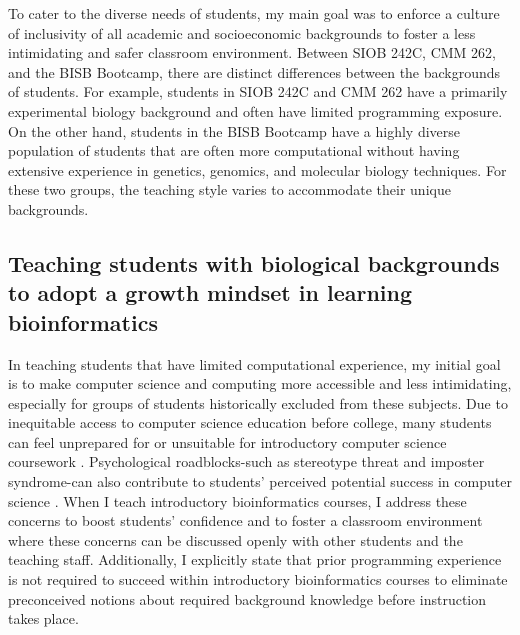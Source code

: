 To cater to the diverse needs of students, my main goal was to enforce a culture of inclusivity of all academic and socioeconomic backgrounds to foster a less intimidating and safer classroom environment. Between SIOB 242C, CMM 262, and the BISB Bootcamp, there are distinct differences between the backgrounds of students. For example, students in SIOB 242C and CMM 262 have a primarily experimental biology background and often have limited programming exposure. On the other hand, students in the BISB Bootcamp have a highly diverse population of students that are often more computational without having extensive experience in genetics, genomics, and molecular biology techniques. For these two groups, the teaching style varies to accommodate their unique backgrounds. 

\subsection{Teaching students with biological backgrounds to adopt a growth mindset in learning bioinformatics}

In teaching students that have limited computational experience, my initial goal is to make computer science and computing more accessible and less intimidating, especially for groups of students historically excluded from these subjects. Due to inequitable access to computer science education before college, many students can feel unprepared for or unsuitable for introductory computer science coursework \cite{wang2016,stout2017,brown2010,kirby1990,hubbardcheuoua2021,lewis2015,rogers2016,shah2014,shinohara2020}. Psychological roadblocks-such as stereotype threat and imposter syndrome-can also contribute to students' perceived potential success in computer science \cite{steele2002,thoman2013,stout2017,smith2008,eschenbach2014,bell2003,kumar2012,halljr.2018,falkner2015,rosenstein2020}. When I teach introductory bioinformatics courses, I address these concerns to boost students' confidence and to foster a classroom environment where these concerns can be discussed openly with other students and the teaching staff. Additionally, I explicitly state that prior programming experience is not required to succeed within introductory bioinformatics courses to eliminate preconceived notions about required background knowledge before instruction takes place.

